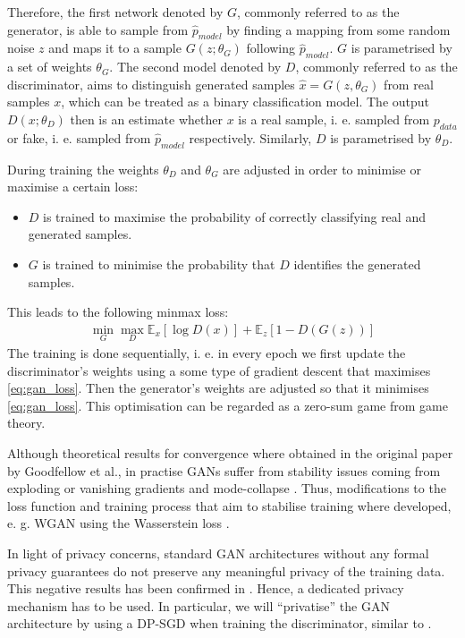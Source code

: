 Therefore, the first network denoted by $G$, commonly referred to as the generator, is able to sample from $\hat{p}_{model}$ by finding a mapping from some random noise $z$ and maps it to a sample $G(z; \theta_G)$ following $\hat{p}_{model}$. $G$ is parametrised by a set of weights $\theta_G$. The second model denoted by $D$, commonly referred to as the discriminator, aims to distinguish generated samples $\hat{x}= G(z,\theta_G)$ from real samples $x$, which can be treated as a binary classification model. The output $D(x; \theta_D)$ then is an estimate whether $x$ is a real sample, i. e. sampled from $p_{data}$ or fake, i. e. sampled from $\hat{p}_{model}$ respectively. Similarly, $D$ is parametrised by $\theta_D$.

During training the weights $\theta_D$ and $\theta_G$ are adjusted in order to minimise or maximise a certain loss:
\begin{itemize}
    \item $D$ is trained to maximise the probability of correctly classifying real and generated samples.
    \item $G$ is trained to minimise the probability that $D$ identifies the generated samples.
\end{itemize}

This leads to the following minmax loss:
\begin{align} \label{eq:gan_loss}
    \min_G \max_D \mathbb{E}_x[\log D(x)] + \mathbb{E}_z[1-D(G(z))]
\end{align}
The training is done sequentially, i. e. in every epoch we first update the discriminator's weights using a some type of gradient descent that maximises  \cref{eq:gan_loss}. Then the generator's weights are adjusted so that it minimises \cref{eq:gan_loss}. This optimisation can be regarded as a zero-sum game from game theory. 

Although theoretical results for convergence where obtained in the original paper by Goodfellow et al., in practise GANs suffer from stability issues coming from exploding or vanishing gradients and mode-collapse \parencite[see][for in-depth review]{gui2020review,jabbar2020survey}. Thus, modifications to the loss function and training process that aim to stabilise training where developed, e. g. WGAN using the Wasserstein loss \parencite{arjovsky2017wasserstein}.

In light of privacy concerns, standard GAN architectures without any formal privacy guarantees do not preserve any meaningful privacy of the training data. This negative results has been confirmed in \parencite{lin2021privacy,stadler2022synthetic}. Hence, a dedicated privacy mechanism has to be used. In particular, we will ``privatise'' the GAN architecture by using a DP-SGD when training the discriminator, similar to \parencite{xie2018differentially}.

